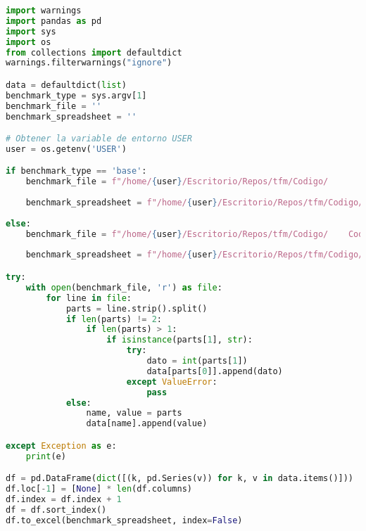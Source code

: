 \begin{lstlisting}[language=Python,showstringspaces=false,caption={Generación de Excel a partir de las estadísticas recogidas},label=lst:saveexcel, showstringspaces=false,frame=single]
import warnings
import pandas as pd
import sys
import os
from collections import defaultdict
warnings.filterwarnings("ignore")

data = defaultdict(list)
benchmark_type = sys.argv[1]
benchmark_file = ''
benchmark_spreadsheet = ''

# Obtener la variable de entorno USER
user = os.getenv('USER')

if benchmark_type == 'base':
    benchmark_file = f"/home/{user}/Escritorio/Repos/tfm/Codigo/        Codigo-Gem5/Base/base_stats.txt"
    
    benchmark_spreadsheet = f"/home/{user}/Escritorio/Repos/tfm/Codigo/    Codigo-Gem5/Base/resultados_base.xlsx"
    
else:
    benchmark_file = f"/home/{user}/Escritorio/Repos/tfm/Codigo/    Codigo-Gem5/Benchmarks/benchmark_stats.txt"
    
    benchmark_spreadsheet = f"/home/{user}/Escritorio/Repos/tfm/Codigo/    Codigo-Gem5/Benchmarks/resultados_benchmark.xlsx"

try:
    with open(benchmark_file, 'r') as file:
        for line in file:
            parts = line.strip().split()
            if len(parts) != 2:
                if len(parts) > 1:              
                    if isinstance(parts[1], str):
                        try:
                            dato = int(parts[1])
                            data[parts[0]].append(dato)
                        except ValueError:
                            pass
            else:
                name, value = parts
                data[name].append(value)

except Exception as e:
    print(e)

df = pd.DataFrame(dict([(k, pd.Series(v)) for k, v in data.items()]))
df.loc[-1] = [None] * len(df.columns)
df.index = df.index + 1
df = df.sort_index()
df.to_excel(benchmark_spreadsheet, index=False)
\end{lstlisting}

